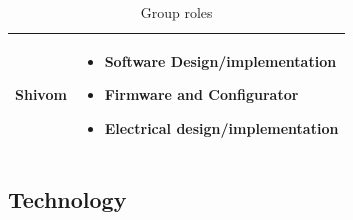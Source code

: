 \documentclass[a4]{article}
\begin{document}
\begin{table}[h!]
\begin{tabularx}{\linewidth}{|Y|Y|}
		Shivom                                             &
		\begin{minipage}[c]{\linewidth} %
			\vspace{2mm}
			\begin{itemize}[leftmargin=*, labelsep=3pt]
				\item Software Design/implementation
				\item Firmware and Configurator
				\item Electrical design/implementation
			\end{itemize}
			\vspace{2mm}
		\end{minipage} \\
		\hline
	\end{tabularx}
	\caption{Group roles}
\end{table}

\clearpage
\subsection{Technology}
\end{document}
